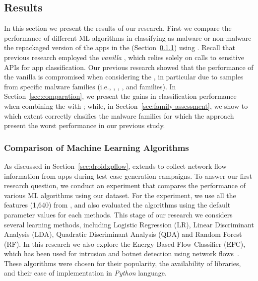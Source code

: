 \subsection{Results}\label{sec:results}




In this section we present the results of our research.
First we compare the performance of different ML algorithms in classifying
as malware or non-malware the repackaged version of the apps in the \fds (Section~\ref{sec:ml}) using \droidxpflow.
Recall that previous research employed the \emph{vanilla}
\mas, which relies solely on calls to sensitive APIs for app classification. Our previous
research showed that the performance of the vanilla \mas is compromised when considering
the \cds, in particular due to samples from specific malware families (i.e., \gps, \rmb, \dwg, and \tjk families).
In Section~\ref{sec:comparation}, we present the gains in classification performance when combining
the \mas with \droidxpflow; while, in Section~\ref{sec:family-assessment}, we show to which extent
\droidxpflow correctly clasifies the malware families for which the \mas approach
present the worst performance in our previous study.

\subsubsection{Comparison of Machine Learning Algorithms}\label{sec:ml}

As discussed in Section~\ref{sec:droidxpflow}, \droidxpflow extends \droidxp to collect network
flow information from apps during test case generation campaigns. To answer our first research question,
we conduct an experiment that compares the performance of various ML algorithms using our \fds dataset. For the experiment, we use all the features (1,640) from \fds, and also evaluated the algorithms using the default parameter values for each methods. This stage of our research we considers several learning methods, including Logistic Regression (LR), Linear Discriminant Analysis (LDA), Quadratic Discriminant Analysis (QDA) and Random Forest (RF). In this research we also explore the Energy-Based Flow Classifier (EFC), which has been used for intrusion and botnet detection using network flows~\cite{DBLP:journals/tnsm/PontesSGBM21}. These algorithms were chosen for their popularity, the availability of libraries, and their ease of implementation in \textit{Python} language.




